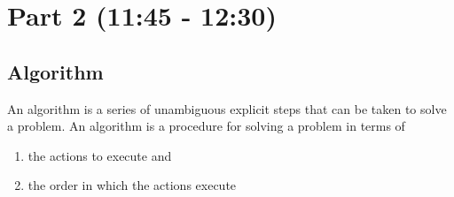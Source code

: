 \documentclass[11pt]{article}
\begin{document}
\section*{Part 2 (11:45 - 12:30)}
\label{sec-2}
\subsection*{Algorithm}
\label{sec-2-1}

An algorithm is a series of unambiguous explicit steps that can be taken to solve a problem.
An algorithm is a procedure for solving a problem in terms of

\begin{enumerate}
\item the actions to execute and
\item the order in which the actions execute
\end{enumerate}
\end{document}
